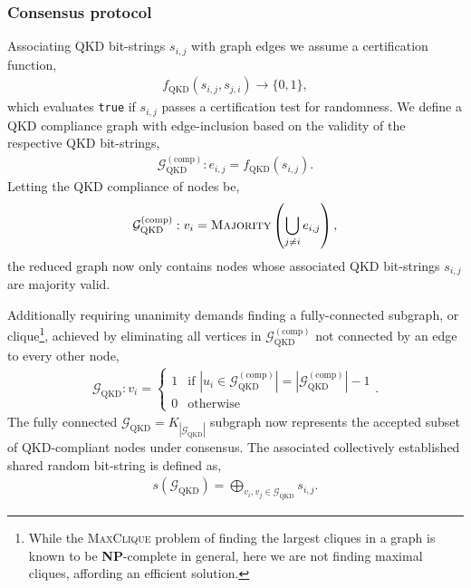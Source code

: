 \documentclass[twocolumn, aps, amsmath, amssymb, nofootinbib, superscriptaddress, longbibliography, floatfix, eqsecnum, rmp]{revtex4-2}
\begin{document}
\subsubsection{Consensus protocol}

Associating QKD bit-strings $s_{i,j}$ with graph edges we assume a certification function,
\begin{align} \label{eq:QKD_verif}
	f_\mathrm{QKD}(s_{i,j},s_{j,i})\to \{0,1\},
\end{align}
which evaluates \texttt{true} if $s_{i,j}$ passes a certification test for randomness. We define a QKD compliance graph with edge-inclusion based on the validity of the respective QKD bit-strings,
\begin{align}
	\mathcal{G}_\mathrm{QKD}^{(\mathrm{comp})}: e_{i,j} = f_\mathrm{QKD}(s_{i,j}).
\end{align}
Letting the QKD compliance of nodes be,
\begin{align} \label{eq:QKD_node_comp}
	\mathcal{G}_\mathrm{QKD}^{(\mathrm{comp})}: v_i = \textsc{Majority}\left(\bigcup_{j\neq i} e_{i,j}\right),
\end{align}
the reduced graph now only contains nodes whose associated QKD bit-strings $s_{i,j}$ are majority valid.

Additionally requiring unanimity demands finding a fully-connected subgraph, or clique\footnote{While the \textsc{MaxClique} problem of finding the largest cliques in a graph is known to be \textbf{NP}-complete in general, here we are not finding maximal cliques, affording an efficient solution.}, achieved by eliminating all vertices in $\mathcal{G}_\mathrm{QKD}^{\mathrm{(comp)}}$ not connected by an edge to every other node,
\begin{align}
	\mathcal{G}_\mathrm{QKD}: v_i =
    \begin{cases}
        1 & \text{if } |u_i \in \mathcal{G}_\mathrm{QKD}^{\mathrm{(comp)}}| = |\mathcal{G}_\mathrm{QKD}^{\mathrm{(comp)}}| - 1\\
        0 & \text{otherwise}
    \end{cases}.
\end{align}
The fully connected \mbox{$\mathcal{G}_\mathrm{QKD}= K_{|\mathcal{G}_\mathrm{QKD}|}$} subgraph now represents the accepted subset of QKD-compliant nodes under consensus. The associated collectively established shared random bit-string is defined as,
\begin{align}
	s(\mathcal{G}_\mathrm{QKD}) = \bigoplus_{v_i,v_j\in \mathcal{G}_\mathrm{QKD}} {s_{i,j}}.
\end{align}
\end{document}
